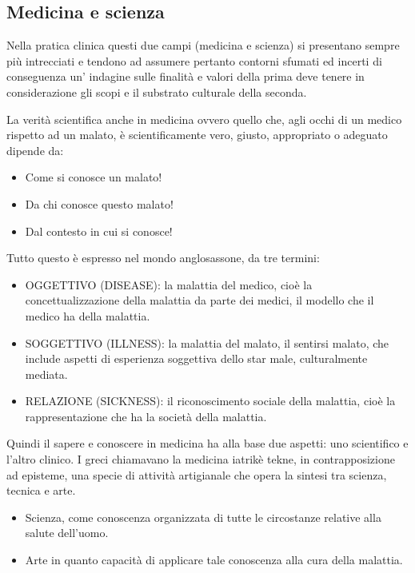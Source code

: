   \subsection{Medicina e scienza}

  Nella pratica clinica questi due campi (medicina e scienza) si
  presentano sempre più intrecciati e tendono ad assumere pertanto
  contorni sfumati ed incerti di conseguenza un' indagine sulle finalità
  e valori della prima deve tenere in considerazione gli scopi e il
  substrato culturale della seconda.

  La verità scientifica anche in medicina ovvero quello che, agli occhi
  di un medico rispetto ad un malato, è scientificamente vero, giusto,
  appropriato o adeguato dipende da:
\begin{itemize}
\item
  Come si conosce un malato!
\item
  Da chi conosce questo malato!
\item
  Dal contesto in cui si conosce!
\end{itemize}

  Tutto questo è espresso nel mondo anglosassone, da tre termini:
  \begin{itemize}
\item
  OGGETTIVO (DISEASE): la malattia del medico, cioè la
  concettualizzazione della malattia da parte dei medici, il modello che
  il medico ha della malattia.
\item
  SOGGETTIVO (ILLNESS): la malattia del malato, il sentirsi malato, che
  include aspetti di esperienza soggettiva dello star male,
  culturalmente mediata.
\item
  RELAZIONE (SICKNESS): il riconoscimento sociale della malattia, cioè
  la rappresentazione che ha la società della malattia.
\end{itemize}

  Quindi il sapere e conoscere in medicina ha alla base due aspetti: uno
  scientifico e l'altro clinico. I greci chiamavano la medicina iatrikè
  tekne, in contrapposizione ad episteme, una specie di attività
  artigianale che opera la sintesi tra scienza, tecnica e arte.
  \begin{itemize}
\item
  Scienza, come conoscenza organizzata di tutte le circostanze relative
  alla salute dell'uomo.
\item
  Arte in quanto capacità di applicare tale conoscenza alla cura della
  malattia.
  \end{itemize}

